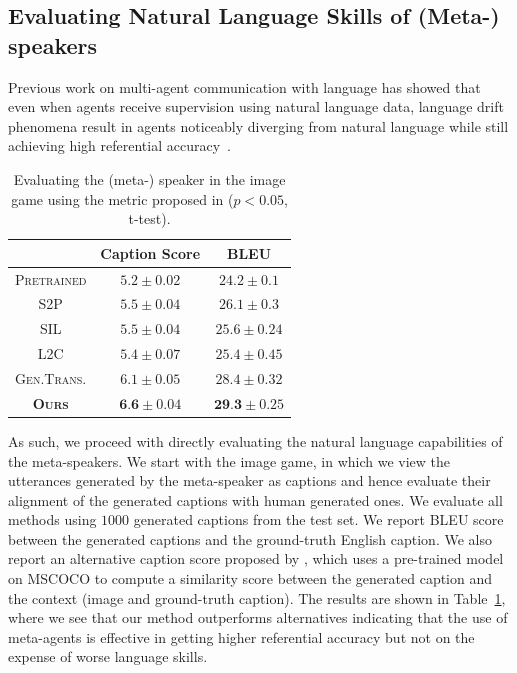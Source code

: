 \documentclass{article}
\newcommand{\ltc}{\textsc{L2C\xspace}}
\newcommand{\stp}{\textsc{S2P\xspace}}
\newcommand{\gentrans}{\textsc{Gen.Trans.\xspace}}
\newcommand{\sil}{\textsc{SIL\xspace}}
\begin{document}
\subsection{Evaluating Natural Language Skills of (Meta-) speakers}
\label{subsec:speaker-eval}
Previous work on multi-agent communication with language has showed that even when agents receive supervision using natural language data, language drift phenomena result in agents noticeably diverging from natural language while still achieving high referential accuracy~\citep{lazaridou-etal-2020-multi, lee_countering_2019}.
\begin{table}
  \centering
  \small
  \begin{tabular}{|c|c|c|}
  \toprule
  & Caption Score & BLEU \\
  \midrule
    \textsc{Pretrained} & $5.2 \pm 0.02$ & $24.2 \pm 0.1$\\
    \hline
    \stp & $5.5 \pm 0.04$ & $26.1 \pm 0.3$ \\ 
    \hline
    \sil & $5.5 \pm 0.04$ & $25.6 \pm 0.24$ \\ 
    \hline
    \ltc & $5.4 \pm 0.07$ & $25.4 \pm 0.45$ \\
    \hline
    \gentrans & $6.1 \pm 0.05$ & $28.4 \pm 0.32$ \\
    \hline
    \textbf{\textsc{Ours}} & $\textbf{6.6} \pm 0.04$ & $\textbf{29.3} \pm 0.25$ \\
    \bottomrule
  \end{tabular}
  \caption{Evaluating the (meta-) speaker in the image game using the metric proposed in \citep{Cui2018CaptionEval} ($p < 0.05$, t-test).}
  \label{tab:meta-spk-autoeval-image}
\end{table}
As such, we proceed with directly evaluating the natural language capabilities of the meta-speakers. 
We start with the image game, in which we view the utterances generated by the meta-speaker as captions and hence evaluate their alignment of the generated captions with human generated ones. We evaluate all methods using $1000$ generated captions from the test set. We report BLEU score~\citep{10.3115/1073083.1073135} between the generated captions and the ground-truth English caption.  We also report an alternative caption score proposed by \citep{Cui2018CaptionEval}, which uses a pre-trained model on MSCOCO to compute a similarity score between the generated caption and the context (image and ground-truth caption). The results are shown in Table~\ref{tab:meta-spk-autoeval-image}, where we see that our method outperforms alternatives indicating that the use of meta-agents is effective in getting higher referential accuracy but not on the expense of worse language skills.
\end{document}
